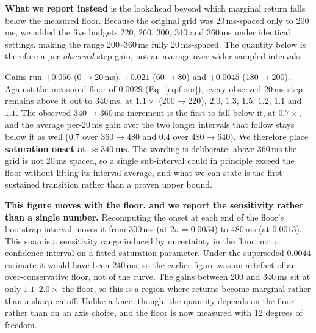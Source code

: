 \documentclass[journal]{IEEEtran}
\begin{document}
\textbf{What we report instead} is the lookahead beyond which marginal return
falls below the measured floor. Because the original grid was 20\,ms-spaced
only to 200\,ms, we added the five budgets 220, 260, 300, 340 and 360\,ms
under identical settings, making the range 200--360\,ms fully 20\,ms-spaced.
The quantity below is therefore a per-\emph{observed}-step gain, not an average
over wider sampled intervals.

Gains run $+0.056$ (0$\rightarrow$20\,ms), $+0.021$ (60$\rightarrow$80) and
$+0.0045$ (180$\rightarrow$200). Against the measured floor of $0.0029$
(Eq.~\ref{eq:floor}), every observed 20\,ms step remains above it out to
340\,ms, at $1.1\times$ (200$\rightarrow$220), $2.0$, $1.3$, $1.5$, $1.2$,
$1.1$ and $1.1$. The observed $340\rightarrow360$\,ms increment is the first to
fall below it, at $0.7\times$, and the average per-20\,ms gain over the two
longer intervals that follow stays below it as well ($0.7$ over
$360\rightarrow480$ and $0.4$ over $480\rightarrow640$). We therefore place
\textbf{saturation onset at ${\approx}340$\,ms}. The wording is deliberate:
above 360\,ms the grid is not 20\,ms spaced, so a single sub-interval could in
principle exceed the floor without lifting its interval average, and what we
can state is the first sustained transition rather than a proven upper bound.

\textbf{This figure moves with the floor, and we report the sensitivity rather
than a single number.} Recomputing the onset at each end of the floor's
bootstrap interval moves it from 300\,ms (at $2\sigma=0.0034$) to 480\,ms (at
$0.0013$). This span is a sensitivity range induced by uncertainty in the
floor, not a confidence interval on a fitted saturation parameter. Under
the superseded $0.0044$ estimate it would have been 240\,ms, so the earlier
figure was an artefact of an over-conservative floor, not of the curve. The
gains between 200 and 340\,ms sit at only $1.1$--$2.0\times$ the floor, so this
is a region where returns become marginal rather than a sharp cutoff. Unlike a
knee, though, the quantity depends on the floor rather than on an axis
choice, and the floor is now measured with 12 degrees of freedom.
\end{document}
